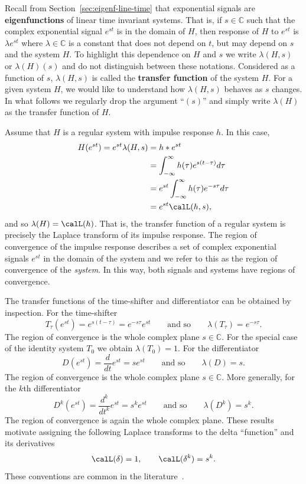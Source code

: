 \documentclass[11pt,a4paper]{book}
\theoremstyle{plain}
\numberwithin{equation}{section}
\newcommand{\complex}{{\mathbb C}}
\newcommand{\term}{\textbf}
\begin{document}
Recall from Section~\ref{sec:eigenf-line-time} that exponential signals are \term{eigenfunctions} of linear time invariant systems.  That is, if $s \in \complex$ such that the complex exponential signal $e^{st}$ is in the domain of $H$, then response of $H$ to $e^{st}$ is $\lambda e^{st}$ where $\lambda \in \complex$ is a constant that does not depend on $t$, but may depend on $s$ and the system $H$.  To highlight this dependence on $H$ and $s$ we write $\lambda(H,s)$ or $\lambda(H)(s)$ and do not distinguish between these notations.  Considered as a function of $s$, $\lambda(H,s)$ is called the \term{transfer function} of the system $H$.  For a given system $H$, we would like to understand how $\lambda(H,s)$ behaves as $s$ changes.  In what follows we regularly drop the argument ``$(s)$'' and simply write $\lambda(H)$ as the transfer function of $H$.  

Assume that $H$ is a regular system with impulse response $h$.  In this case,
\begin{align*}
H(e^{st}) = e^{st} \lambda(H,s) &= h * e^{st} \\
&= \int_{-\infty}^{\infty} h(\tau) e^{s(t - \tau)} d\tau \\
&= e^{st} \int_{-\infty}^{\infty} h(\tau) e^{-s \tau} d\tau \\
&= e^{st} \calL(h,s),
\end{align*}
and so $\lambda(H) = \calL(h)$.  That is, the transfer function of a regular system is precisely the Laplace transform of its impulse response.  The region of convergence of the impulse response describes a set of complex exponential signals $e^{st}$ in the domain of the system and we refer to this as the region of convergence of the \emph{system}.  In this way, both signals and systems have regions of convergence.

The transfer functions of the time-shifter and differentiator can be obtained by inspection.  For the time-shifter
\begin{equation}\label{eq:timeshiftertransferfunction}
T_\tau(e^{st}) = e^{s(t-\tau)} = e^{-s\tau} e^{st} \qquad \text{and so} \qquad \lambda(T_\tau) = e^{-s\tau}.
\end{equation}
The region of convergence is the whole complex plane $s \in \complex$.  For the special case of the identity system $T_0$ we obtain $\lambda(T_0) = 1$.  For the differentiator
\[
D(e^{st}) = \frac{d}{d t} e^{st} = s e^{st} \qquad \text{and so} \qquad \lambda(D) = s.
\]
The region of convergence is the whole complex plane $s \in \complex$.  More generally, for the $k$th differentiator
\begin{equation}\label{eq:lambdadifferentiator}
D^k(e^{st}) = \frac{d^k}{d t^k} e^{st} = s^k e^{st} \qquad \text{and so} \qquad  \lambda(D^k) = s^k.
\end{equation}
The region of convergence is again the whole complex plane.  These results motivate assigning the following Laplace transforms to the delta ``function'' and its derivatives
\[
\calL(\delta) = 1, \qquad \calL(\delta^k) = s^k.
\]
These conventions are common in the literature~\citep{Oppenheiim_sigs_sys_1996}.
\end{document}
